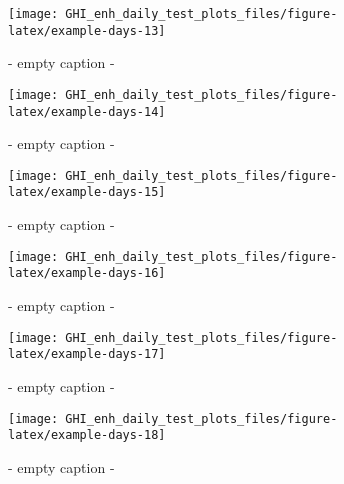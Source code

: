 \documentclass[
  10pt,
  a4paper,oneside]{article}
\begin{document}
\begin{figure}[H]

{\centering \texttt{[image: GHI\_enh\_daily\_test\_plots\_files/figure-latex/example-days-13]} 

}

\caption{ - empty caption - }\label{fig:example-days-13}
\end{figure}

\begin{figure}[H]

{\centering \texttt{[image: GHI\_enh\_daily\_test\_plots\_files/figure-latex/example-days-14]} 

}

\caption{ - empty caption - }\label{fig:example-days-14}
\end{figure}

\begin{figure}[H]

{\centering \texttt{[image: GHI\_enh\_daily\_test\_plots\_files/figure-latex/example-days-15]} 

}

\caption{ - empty caption - }\label{fig:example-days-15}
\end{figure}

\begin{figure}[H]

{\centering \texttt{[image: GHI\_enh\_daily\_test\_plots\_files/figure-latex/example-days-16]} 

}

\caption{ - empty caption - }\label{fig:example-days-16}
\end{figure}

\begin{figure}[H]

{\centering \texttt{[image: GHI\_enh\_daily\_test\_plots\_files/figure-latex/example-days-17]} 

}

\caption{ - empty caption - }\label{fig:example-days-17}
\end{figure}

\begin{figure}[H]

{\centering \texttt{[image: GHI\_enh\_daily\_test\_plots\_files/figure-latex/example-days-18]} 

}

\caption{ - empty caption - }\label{fig:example-days-18}
\end{figure}
\end{document}
